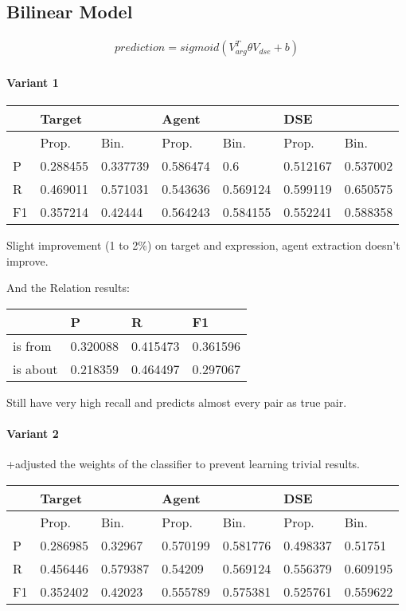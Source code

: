\documentclass[a4paper, 12pt]{article}
\begin{document}
\subsection{Bilinear Model}
\begin{align*}
  prediction = sigmoid(V_{arg}^T\theta V_{dse} + b) 
\end{align*}

\paragraph{Variant 1}

\begin{table}[h!]
\centering
\begin{tabular}{l|ll|ll|ll}
\hline
   & \multicolumn{2}{l}{Target} & \multicolumn{2}{l}{Agent} & \multicolumn{2}{l}{DSE} \\ \hline
   & Prop.& Bin.& Prop.& Bin.& Prop.& Bin.\\
 \hline
P  &0.288455&0.337739 &0.586474 &      0.6 &0.512167 & 0.537002 \\
R  &0.469011&0.571031 &0.543636 & 0.569124 &0.599119 & 0.650575 \\
F1 &0.357214& 0.42444 &0.564243 & 0.584155 &0.552241 & 0.588358 \\ \hline
\end{tabular}
\end{table}

Slight improvement (1 to 2\%) on target and expression, agent extraction doesn't
improve.

And the Relation results:
\begin{table}[h!]
\centering
\begin{tabular}{l|l|l|l}
\hline
         & P & R & F1    \\\hline
is from  & 0.320088& 0.415473& 0.361596\\
is about & 0.218359& 0.464497& 0.297067 \\
\hline
\end{tabular}
\end{table}
Still have very high recall and predicts almost every pair as true pair.

\paragraph{Variant 2}
+adjusted the weights of the classifier to prevent learning trivial results.

\begin{table}[h!]
\centering
\begin{tabular}{l|ll|ll|ll}
\hline
   & \multicolumn{2}{l}{Target} & \multicolumn{2}{l}{Agent} & \multicolumn{2}{l}{DSE} \\ \hline
   & Prop.& Bin.& Prop.& Bin.& Prop.& Bin.\\
 \hline
P  &0.286985& 0.32967 &0.570199 & 0.581776 &0.498337 &  0.51751 \\
R  &0.456446&0.579387 & 0.54209 & 0.569124 &0.556379 & 0.609195 \\
F1 &0.352402& 0.42023 &0.555789 & 0.575381 &0.525761 & 0.559622 \\ \hline
\end{tabular}
\end{table}
\end{document}
